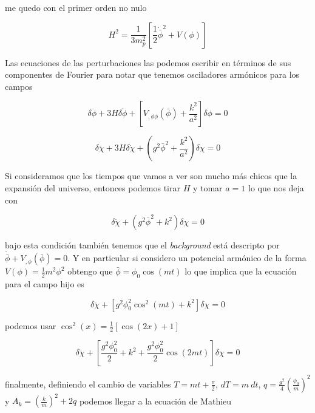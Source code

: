 \noindent
me quedo con el primer orden no nulo

\begin{equation}
    H^2 = \frac{1}{3 m_p^2} \left[ \frac{1}{2} \dot{\bar{\phi}}^2 + V(\phi) \right]
\end{equation}

Las ecuaciones de las perturbaciones las podemos escribir en términos de sus componentes de Fourier para notar que tenemos osciladores armónicos para los campos

\begin{equation}
    \delta \ddot{\phi} + 3 H \delta \dot{\phi} + \left[ V_{,\phi\phi} (\bar{\phi}) + \frac{k^2}{a^2} \right] \delta \phi = 0
\end{equation}

\begin{equation}
    \delta \ddot{\chi} + 3 H \delta \dot{\chi} + \left( g^2 \bar{\phi}^2 + \frac{k^2}{a^2} \right) \delta \chi = 0
\end{equation}

Si consideramos que los tiempos que vamos a ver son mucho más chicos que la expansión del universo, entonces podemos tirar $H$ y tomar $a = 1$ lo que nos deja con

\begin{equation}
    \delta \ddot{\chi} + \left( g^2 \bar{\phi}^2 + k^2 \right) \delta \chi = 0
\end{equation}

\noindent
bajo esta condición también tenemos que el \textit{background} está descripto por $\displaystyle \ddot{\bar{\phi}} + V_{,\phi} (\bar{\phi}) = 0$. Y en particular si considero un potencial armónico de la forma $\displaystyle V(\phi) = \frac{1}{2} m^2 \phi^2$ obtengo que $\bar{\phi} = \phi_0 \cos (m t)$ lo que implica que la ecuación para el campo hijo es

\begin{equation}
    \delta \ddot{\chi} + \left[ g^2 \phi_0^2 \cos^2 (m t) + k^2 \right] \delta \chi = 0
\end{equation}

\noindent
podemos usar $\displaystyle \cos^2 (x) = \frac{1}{2} \left[ \cos(2x) + 1  \right]$

\begin{equation*}
    \delta \ddot{\chi} + \left[ \frac{g^2 \phi_0^2}{2} + k^2 + \frac{g^2 \phi_0^2}{2} \cos(2mt) \right] \delta \chi = 0
\end{equation*}

\noindent
finalmente, definiendo el cambio de variables $\displaystyle T = mt + \frac{\pi}{2}$, $dT = m \ dt$, $\displaystyle q = \frac{g^2}{4} \left( \frac{\phi_0}{m} \right)^2$ y $\displaystyle A_k = \left( \frac{k}{m} \right)^2 + 2 q$ podemos llegar a la ecuación de Mathieu

